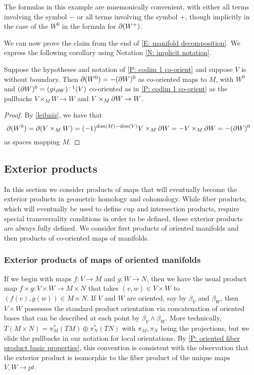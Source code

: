 \begin{remark}
	The formulas in this example are mnemonically convenient, with either all terms involving the symbol $-$ or all terms involving the symbol $+$, though implicitly in the case of the $W^0$ in the formula for $\partial (W^+)$.
\end{remark}

We can now prove the claim from the end of \cref{E: manifold decomposition}.
We express the following corollary using Notation \ref{N: implicit notation}.

\begin{corollary}\label{C: co-orient W0}
	Suppose the hypotheses and notation of \cref{P: codim 1 co-orient} and suppose $V$ is without boundary.
	Then $\partial (W^0) = -(\partial W)^0$ as co-oriented maps to $M$, with $W^0$ and $(\partial W)^0 = (gi_{\partial W})^{-1}(V)$ co-oriented as in \cref{P: codim 1 co-orient} as the pullbacks $V \times_M W \to W$ and $V \times_M \partial W \to W$.
\end{corollary}

\begin{proof}
	By \cref{leibniz}, we have that
	$$\partial (W^0) = \partial (V \times_M W) = (-1)^{\dim(M)-\dim(V)}V \times_M \partial W = -V \times_M \partial W = -(\partial W)^0$$
	as spaces mapping $M$.
\end{proof}

\subsection{Exterior products}\label{S: exterior products}
In this section we consider products of maps that will eventually become the exterior products in geometric homology and cohomology.
While fiber products, which will eventually be used to define cup and intersection products, require special transversality conditions in order to be defined, these exterior products are always fully defined.
We consider first products of oriented manifolds and then products of co-oriented maps of manifolds.

\subsubsection{Exterior products of maps of oriented manifolds}

If we begin with maps $f \colon V \to M$ and $g \colon W \to N$, then we have the usual product map $f \times g \colon V \times W \to M \times N$ that takes $(v,w) \in V \times W$ to $(f(v),g(w)) \in M \times N$.
If $V$ and $W$ are oriented, say by $\beta_V$ and $\beta_W$, then $V \times W$ possesses the standard product orientation via concatenation of oriented bases that can be described at each point by $\beta_V \wedge \beta_W$.
More technically, $T(M \times N) = \pi_M^*(TM) \oplus \pi_N^*(TN)$ with $\pi_M, \pi_N$ being the projections, but we elide the pullbacks in our notation for local orientations.
By \cref{P: oriented fiber product basic properties}, this convention is consistent with the observation that the exterior product is isomorphic to the fiber product of the unique maps $V,W \to pt$.

